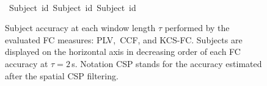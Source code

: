 \begin{figure}[h!]
	{}
	{}\\
	\hbox{\hspace{1.9cm} \tiny{Subject id}\hspace{2.8cm} \tiny{Subject id}\hspace{2.9cm} \tiny{Subject id}}
	\caption{{Subject accuracy at each window length $\tau$ performed by the evaluated FC measures: PLV,~CCF, and KCS-FC. Subjects are displayed on the horizontal axis in decreasing order of each FC accuracy at $\tau=2$\,{s}. Notation CSP stands for the accuracy estimated after the spatial CSP filtering.} }\label{Fig:FCx}
\end{figure}

